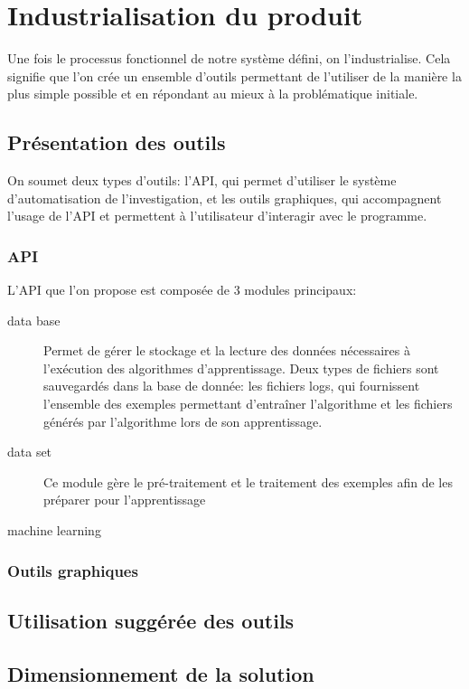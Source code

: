 \chapter{Industrialisation du produit}
\label{Industrialisation du produit}
\thispagestyle{fancy}
Une fois le processus fonctionnel de notre système défini, on l'industrialise. Cela signifie que l'on crée un ensemble d'outils permettant de l'utiliser de la manière la plus simple possible et en répondant au mieux à la problématique initiale. 

\section{Présentation des outils}
\label{Industrialisation du produit: Présentation des outils}
On soumet deux types d'outils: l'API, qui permet d'utiliser le système d'automatisation de l'investigation, et les outils graphiques, qui accompagnent l'usage de l'API et permettent à l'utilisateur d'interagir avec le programme.  

\subsection{API}
\label{Industrialisation du produit: Présentation des outils:API}
L'API que l'on propose est composée de 3 modules principaux:
\begin{description}
	\item [data base] Permet de gérer le stockage et la lecture des données nécessaires à l'exécution des algorithmes d'apprentissage. Deux types de fichiers sont sauvegardés dans la base de donnée: les fichiers logs, qui fournissent l'ensemble des exemples permettant d'entraîner l'algorithme et les fichiers générés par l'algorithme lors de son apprentissage.
	\item [data set] Ce module gère le pré-traitement et le traitement des exemples afin de les préparer pour l'apprentissage 
	\item [machine learning]
\end{description}

\subsection{Outils graphiques}
\label{Industrialisation du produit: Présentation des outils: Outils graphiques}

\section{Utilisation suggérée des outils}
\label{Industrialisation du produit: Utilisation suggérée des outils}

\section{Dimensionnement de la solution}
\label{Industrialisation du produit: Dimensionnement de la solution}
